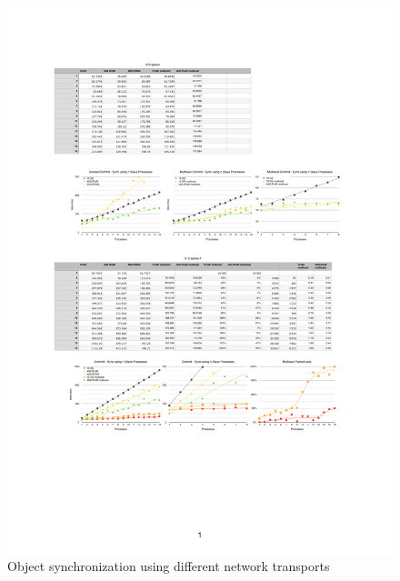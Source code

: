 \documentclass[10pt,journal,compsoc]{IEEEtran}
\begin{document}
\begin{figure}[p!]\center
  \includegraphics[height=.19\textheight]{images/ifdist}
  \caption{\label{fIFDist}Object synchronization using different network
    transports}
\end{figure}

\end{document}

